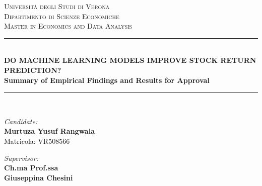 \documentclass[11pt]{article}
\begin{document}
\begin{center}
    \textsc{\Large Università degli Studi di Verona} \\
    \vspace{0.2cm}
    \textsc{\large Dipartimento di Scienze Economiche} \\
    \vspace{0.2cm}
    \textsc{\small Master in Economics and Data Analysis} \\
    \vspace{0.5cm}
    \rule{\linewidth}{0.5mm} \\
    \vspace{0.3cm}
    {\Large \bfseries DO MACHINE LEARNING MODELS IMPROVE STOCK RETURN PREDICTION?} \\
    \vspace{0.2cm}
    {\large \bfseries Summary of Empirical Findings and Results for Approval} \\
    \vspace{0.2cm}
    \rule{\linewidth}{0.5mm} \\
    \vspace{0.8cm}
    
    \begin{minipage}[t]{0.45\textwidth}
        \begin{flushleft} \large
            \emph{Candidate:} \\
            \textbf{Murtuza Yusuf Rangwala} \\
            Matricola: VR508566
        \end{flushleft}
    \end{minipage}
    \hfill
    \begin{minipage}[t]{0.45\textwidth}
        \begin{flushright} \large
            \emph{Supervisor:} \\
            \textbf{Ch.ma Prof.ssa} \\
            \textbf{Giuseppina Chesini}
        \end{flushright}
    \end{minipage}
    \vspace{0.8cm}
\end{center}

\begin{abstract}
    This document presents a concise summary of the empirical findings, model formulations, and significance diagnostics of the master's thesis. We conduct a rigorous comparative study between traditional econometric benchmarks and modern machine learning/deep learning architectures in forecasting stock excess returns for S\&P 500 constituents from 2015 to 2024. The empirical framework implements a 3-stage feature selection engine to select the cleanest 59 features. We evaluate gradient boosted decision trees (\textbf{XGBoost}), causal recurrent sequences (\textbf{LSTM}), and a custom multimodal deep learning architecture, the \textbf{Temporal Fusion Deep Multimodal Gated Attention Network (TFDMGA-TS)}. All results are lookahead free, net of transaction costs, and verified using Newey-West HAC standard errors and Jobson-Korkie tests.
\end{abstract}
\end{document}
